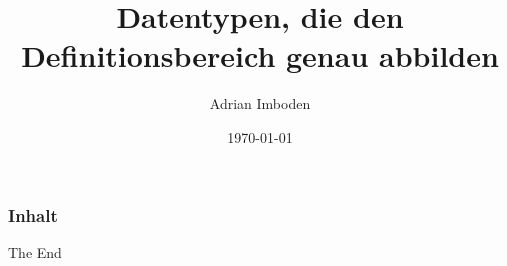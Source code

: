 \documentclass{beamer}
\title[]{Datentypen, die den Definitionsbereich genau abbilden}
\subtitle[]{}
\author{Adrian Imboden}
\institute[]
{%
\smallskip\\
\textit{adi@thingdust.com}\\
\textit{adrian.imboden@komaxgroup.com}
\medskip\\
\url{https://github.com/adrianimboden/cppusergroup-datatypes-with-domain}\\
}
\date{\today} %
\begin{document}
\begin{frame}
	\titlepage%
\end{frame}

\begin{frame}
	\frametitle{Inhalt}
	\tableofcontents[]
\end{frame}




\begin{frame}[fragile]
	\begin{figure}[ht]
		\centering
	\end{figure}
	\Huge{\centerline{The End}}
\end{frame}
\end{document}
